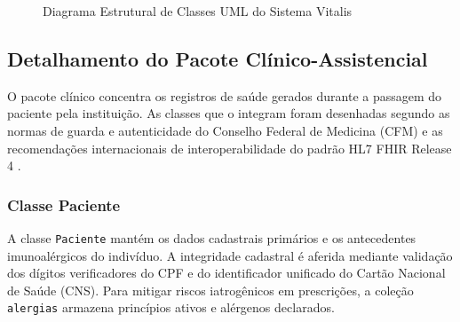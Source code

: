 \begin{figure}[H]
{
}
\caption{Diagrama Estrutural de Classes UML do Sistema Vitalis}
\label{fig:diagrama_classes_geral}
\end{figure}

\subsection{Detalhamento do Pacote Clínico-Assistencial}
\label{subsec:detalhe_clinico}

O pacote clínico concentra os registros de saúde gerados durante a passagem do paciente pela instituição. As classes que o integram foram desenhadas segundo as normas de guarda e autenticidade do Conselho Federal de Medicina (CFM) \cite{cfm_prontuario:2007, cfm_digital:2021} e as recomendações internacionais de interoperabilidade do padrão HL7 FHIR Release 4 \cite{hl7_fhir:2019}.

\subsubsection{Classe Paciente}
A classe \texttt{Paciente} mantém os dados cadastrais primários e os antecedentes imunoalérgicos do indivíduo. A integridade cadastral é aferida mediante validação dos dígitos verificadores do CPF e do identificador unificado do Cartão Nacional de Saúde (CNS). Para mitigar riscos iatrogênicos em prescrições, a coleção \texttt{alergias} armazena princípios ativos e alérgenos declarados.

